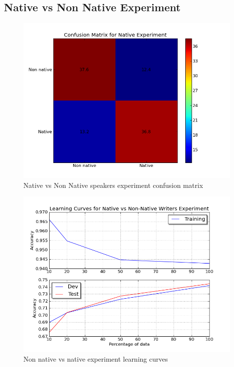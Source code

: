 \documentclass[11pt]{article}
\begin{document}
\subsection{Native vs Non Native Experiment}
\begin{figure}[htp]
\centering
\includegraphics[scale=0.45]{native_cfm.png}
\caption{Native vs Non Native speakers experiment confusion matrix}
\label{non_cfm}
\end{figure}

\begin{figure}[htp]
\centering
\includegraphics[scale=0.45]{native_lc.png}
\caption{Non native vs native experiment learning curves}
\label{non_lc}
\end{figure}
\end{document}
